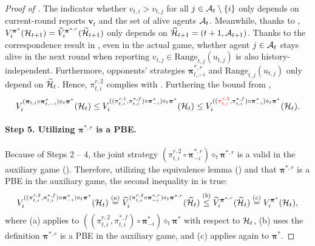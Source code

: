 \begin{proof}[Proof of ]
The indicator whether $v_{t,i}>v_{t,j}$ for all $j\in \mathcal{A}_t\setminus\{i\}$ only depends on current-round reports $\bm v_t$ and the set of alive agents $\mathcal{A}_t$. Meanwhile, thanks to , $V_i^{\bm \pi^\ast}(\mathcal{H}_{t+1})=\widetilde V_i^{{\bm \pi}^{\ast,r}}(\widetilde {\mathcal{H}}_{t+1})$ only depends on $\widetilde {\mathcal{H}}_{t+1}=(t+1,\mathcal{A}_{t+1})$. 
Thanks to the correspondence result in , even in the actual game, whether agent $j\in \mathcal{A}_t$ stays alive in the next round when reporting $v_{t,j}\in \text{Range}_{t,j}(u_{t,j})$ is also history-independent. Furthermore, opponents' strategies ${\bm \pi}_{t,-i}^{\ast,r}$ and $\text{Range}_{t,j}(u_{t,j})$ only depend on $\widetilde {\mathcal{H}}_t$. Hence, $\pi_{t,i}^{r,2}$ complies with . Furthering the bound from ,
\begin{equation}\label{eq:obj after removing history-dependency}
V_i^{(\bm \pi_{t,i}\circ \bm \pi_{t,-i}^\ast)\diamond_t \bm \pi^\ast}(\mathcal{H}_t)\le V_i^{((\pi_{t,i}^{r,1},{\pi}_{t,i}^{\ast,f})\circ {\bm \pi}_{-i}^\ast)\diamond_t \bm \pi^\ast}(\mathcal{H}_t) \leq V_i^{(({\color{red}\pi_{t,i}^{r,2}},{\pi}_{t,i}^{\ast,f})\circ {\bm \pi}_{-i}^\ast)\diamond_t \bm \pi^\ast}(\mathcal{H}_t).
\end{equation}

\paragraph{Step 5. Utilizing ${\bm \pi}^{\ast,r}$ is a PBE.}
Because of Steps 2 -- 4, the joint strategy $(\pi_{t,i}^{r,2}\circ {\bm \pi}_{-i}^{\ast,r})\diamond_t {\bm \pi}^{\ast,r}$ is a valid in the auxiliary game (). Therefore, utilizing the equivalence lemma () and that ${\bm \pi}^{\ast,r}$ is a PBE in the auxiliary game, the second inequality in  is true:
\begin{equation*}
V_i^{((\pi_{t,i}^{r,2},{\pi}_{t,i}^{\ast,f})\circ {\bm \pi}_{-i}^\ast)\diamond_t \bm \pi^\ast}(\mathcal{H}_t)\overset{(a)}{=}\widetilde V_i^{(\pi_{t,i}^{r,2}\circ {\bm \pi}_{-i}^{\ast,r})\diamond_t {\bm \pi}^{\ast,r}}(\widetilde {\mathcal{H}}_t)\overset{(b)}{\le} \widetilde V_i^{{\bm \pi}^{\ast,r}}(\widetilde {\mathcal{H}}_t)\overset{(c)}{=}V_i^{\bm \pi^\ast}(\mathcal{H}_t),
\end{equation*}
where (a) applies  to $((\pi_{t,i}^{r,2},{\pi}_{t,i}^{\ast,f})\circ {\bm \pi}_{-i}^\ast)\diamond_t \bm \pi^\ast$ with respect to $\mathcal{H}_t$, (b) uses the definition ${\bm \pi}^{\ast,r}$ is a PBE in the auxiliary game, and (c) applies  again to $\bm \pi^\ast$.


\end{proof}
